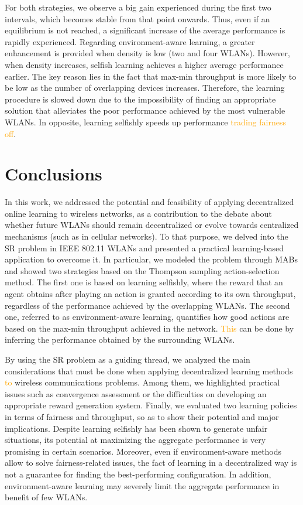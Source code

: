 \documentclass[preprint,12pt]{elsarticle}
\begin{document}
For both strategies, we observe a big gain experienced during the first two intervals, which becomes stable from that point onwards. Thus, even if an equilibrium is not reached, a significant increase of the average performance is rapidly experienced. Regarding environment-aware learning, a greater enhancement is provided when density is low (two and four WLANs). However, when density increases, selfish learning achieves a higher average performance earlier. The key reason lies in the fact that max-min throughput is more likely to be low as the number of overlapping devices increases. Therefore, the learning procedure is slowed down due to the impossibility of finding an appropriate solution that alleviates the poor performance achieved by the most vulnerable WLANs. In opposite, learning selfishly speeds up performance \textcolor{orange}{trading fairness off}.

\section{Conclusions}
\label{section:conclusions}		
In this work, we addressed the potential and feasibility of applying decentralized online learning to wireless networks, as a contribution to the debate about whether future WLANs should remain decentralized or evolve towards centralized mechanisms (such as in cellular networks). To that purpose, we delved into the SR problem in IEEE 802.11 WLANs and presented a practical learning-based application to overcome it. In particular, we modeled the problem through MABs and showed two strategies based on the Thompson sampling action-selection method. The first one is based on learning selfishly, where the reward that an agent obtains after playing an action is granted according to its own throughput, regardless of the performance achieved by the overlapping WLANs. The second one, referred to as environment-aware learning, quantifies how good actions are based on the max-min throughput achieved in the network. \textcolor{orange}{This} can be done by inferring the performance obtained by the surrounding WLANs. 

By using the SR problem as a guiding thread, we analyzed the main considerations that must be done when applying decentralized learning methods \textcolor{orange}{to} wireless communications problems. Among them, we highlighted practical issues such as convergence assessment or the difficulties on developing an appropriate reward generation system. Finally, we evaluated two learning policies in terms of fairness and throughput, so as to show their potential and major implications. Despite learning selfishly has been shown to generate unfair situations, its potential at maximizing the aggregate performance is very promising in certain scenarios. Moreover, even if environment-aware methods allow to solve fairness-related issues, the fact of learning in a decentralized way is not a guarantee for finding the best-performing configuration. In addition, environment-aware learning may severely limit the aggregate performance in benefit of few WLANs. 
\end{document}
